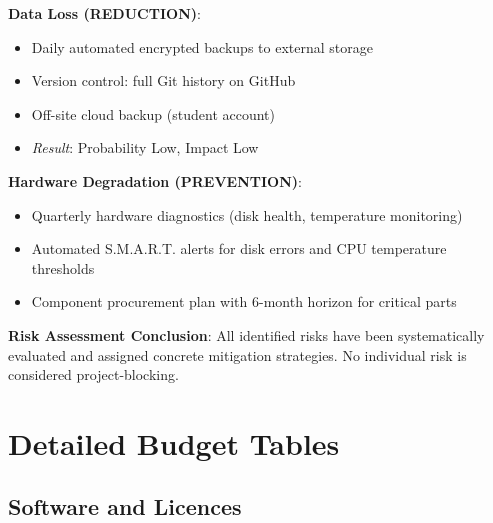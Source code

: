 \textbf{Data Loss (REDUCTION)}:
\begin{itemize}
\item Daily automated encrypted backups to external storage
\item Version control: full Git history on GitHub
\item Off-site cloud backup (student account)
\item \textit{Result}: Probability Low, Impact Low
\end{itemize}

\textbf{Hardware Degradation (PREVENTION)}:
\begin{itemize}
\item Quarterly hardware diagnostics (disk health, temperature monitoring)
\item Automated S.M.A.R.T. alerts for disk errors and CPU temperature thresholds
\item Component procurement plan with 6-month horizon for critical parts
\end{itemize}

\textbf{Risk Assessment Conclusion}: All identified risks have been systematically
evaluated and assigned concrete mitigation strategies. No individual risk is
considered project-blocking.

\section{Detailed Budget Tables}

\subsection{Software and Licences}

